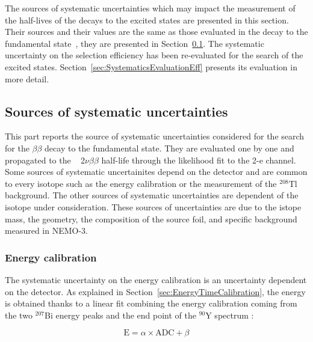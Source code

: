 \documentclass[main.tex]{subfiles}
\begin{document}
\NI The sources of systematic uncertainties which may impact the measurement of the half-lives of the decays to the excited states are presented in this section. Their sources and their values are the same as those evaluated in the decay to the fundamental state~\cite{Arnold2016bed}, they are presented in Section~\ref{sec:CurrentSystematics}. The systematic uncertainty on  the selection efficiency has been re-evaluated for the search of the excited states. Section~\ref{sec:SystematicsEvaluationEff} presents its evaluation in more detail. 



\subsection{Sources of systematic uncertainties} \label{sec:CurrentSystematics}


\NI This part reports the source of systematic uncertainties considered for the search for the $\beta\beta$ decay to the fundamental state. They are evaluated one by one and propagated to the \Cd~ 2$\nu\beta\beta$ half-life through the likelihood fit to the 2-e channel. Some sources of systematic uncertainites depend on the detector and are common to every isotope such as the energy calibration or the measurement of the $^{\text{208}}$Tl background. The other sources of systematic uncertainties are dependent of the isotope under consideration. These sources of uncertainties are due to the istope mass, the geometry, the composition of the source foil, and specific background measured in NEMO-3. 


\subsubsection{Energy calibration}


\NI The systematic uncertainty on the energy calibration is an uncertainty dependent on the detector. As explained in Section~\ref{sec:EnergyTimeCalibration}, the energy is obtained thanks to a linear fit combining the energy calibration coming from the two $^{\text{207}}$Bi energy peaks and the end point of the $^{\text{90}}$Y spectrum :


\begin{equation}
\text{E} = \alpha \times \text{ADC} + \beta
\end{equation} 
\end{document}
